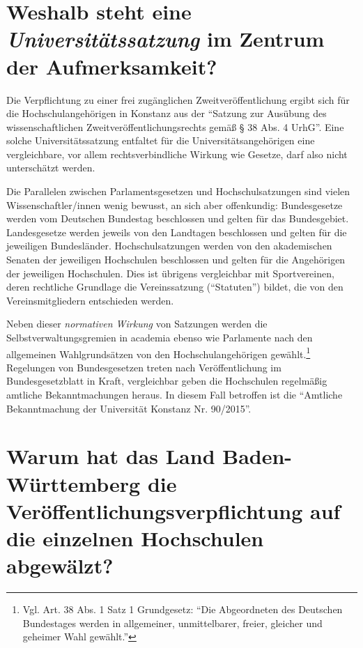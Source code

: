 \documentclass[a4paper,
fontsize=11pt,
oneside,
numbers=noperiodatend,
parskip=half-,
bibliography=totoc,
final
]{scrartcl}
\begin{document}
\hypertarget{weshalb-steht-eine-universituxe4tssatzung-im-zentrum-der-aufmerksamkeit}{%
\section*{\texorpdfstring{Weshalb steht eine
\emph{Universitätssatzung} im Zentrum der
Aufmerksamkeit?}{Weshalb steht eine Universitätssatzung im Zentrum der Aufmerksamkeit?}}\label{weshalb-steht-eine-universituxe4tssatzung-im-zentrum-der-aufmerksamkeit}}

Die Verpflichtung zu einer frei zugänglichen Zweitveröffentlichung
ergibt sich für die Hochschulangehörigen in Konstanz aus der
\enquote{Satzung zur Ausübung des wissenschaftlichen
Zweit\-ver\-öffent\-lich\-ungs\-rechts gemäß § 38 Abs. 4 UrhG}. Eine solche
Universitätssatzung entfaltet für die Universitätsangehörigen eine
vergleichbare, vor allem rechtsverbindliche Wirkung wie Gesetze, darf
also nicht unterschätzt werden.

Die Parallelen zwischen Parlamentsgesetzen und Hochschulsatzungen sind
vielen Wissenschaftler/innen wenig bewusst, an sich aber offenkundig:
Bundesgesetze werden vom Deutschen Bundestag beschlossen und gelten für
das Bundesgebiet. Landesgesetze werden jeweils von den Landtagen
beschlossen und gelten für die jeweiligen Bundesländer.
Hochschulsatzungen werden von den akademischen Senaten der jeweiligen
Hochschulen beschlossen und gelten für die Angehörigen der jeweiligen
Hochschulen. Dies ist übrigens vergleichbar mit Sportvereinen, deren
rechtliche Grundlage die Vereinssatzung (\enquote{Statuten}) bildet, die
von den Vereinsmitgliedern entschieden werden.

Neben dieser \emph{normativen Wirkung} von Satzungen werden die
Selbstverwaltungsgremien in academia ebenso wie Parlamente nach den
allgemeinen Wahlgrundsätzen von den Hochschulangehörigen
gewählt.\footnote{Vgl. Art. 38 Abs. 1 Satz 1 Grundgesetz: \enquote{Die
  Abgeordneten des Deutschen Bundestages werden in allgemeiner,
  unmittelbarer, freier, gleicher und geheimer Wahl gewählt.}}
Regelungen von Bundesgesetzen treten nach Veröffentlichung im
Bundesgesetzblatt in Kraft, vergleichbar geben die Hochschulen
regelmäßig amtliche Bekanntmachungen heraus. In diesem Fall betroffen
ist die \enquote{Amtliche Bekanntmachung der Universität Konstanz Nr.
90/2015}.

\hypertarget{warum-hat-das-land-baden-wuxfcrttemberg-die-veruxf6ffentlichungsverpflichtung-auf-die-einzelnen-hochschulen-abgewuxe4lzt}{%
\section*{Warum hat das Land Baden-Württemberg die
Veröffentlichungsverpflichtung auf die einzelnen Hochschulen
abgewälzt?}\label{warum-hat-das-land-baden-wuxfcrttemberg-die-veruxf6ffentlichungsverpflichtung-auf-die-einzelnen-hochschulen-abgewuxe4lzt}}
\end{document}
